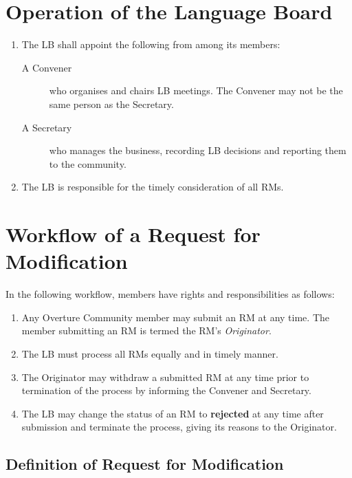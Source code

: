\documentclass[]{article}
\begin{document}
\section{Operation of the Language Board}
\label{sec:exec} 

\begin{enumerate}
\item The LB shall appoint the following from among its members:
\begin{description}
		\item[A Convener] who organises and chairs LB
                  meetings. The Convener may not be the same person as
                  the Secretary.
		\item[A Secretary] who manages the business, recording
                  LB decisions and reporting them to the
                  community.
	\end{description}
\item The LB is responsible for the timely consideration of all
  RMs. 
\end{enumerate}

\section{Workflow of a Request for Modification} %
\label{sec:workflow_of_a_request_for_modification}

In the following workflow, members have rights and responsibilities as follows: 
\begin{enumerate}
\item Any Overture Community member may submit an RM at any time. The member
submitting an RM is termed the RM's \emph{Originator}.

\item The LB must process all RMs equally and in timely manner. 

\item The Originator may withdraw a submitted RM at any time prior to termination of
the process by informing the Convener and Secretary. 

\item The LB may change the status of an RM to \textbf{rejected} at any time
after submission and terminate the process, giving its reasons to the
Originator.
\end{enumerate}

\subsection{Definition of Request for Modification} %
\label{sub:definition_of_request_for_modification}
\end{document}
